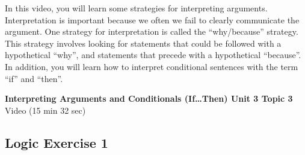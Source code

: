 \documentclass[
]{book}
\begin{document}
In this video, you will learn some strategies for interpreting arguments. Interpretation is important because we often we fail to clearly communicate the argument. One strategy for interpretation is called the ``why/because'' strategy. This strategy involves looking for statements that could be followed with a hypothetical ``why'', and statements that precede with a hypothetical ``because''. In addition, you will learn how to interpret conditional sentences with the term ``if'' and ``then''.

\textbf{Interpreting Arguments and Conditionals (If\ldots Then) Unit 3 Topic 3} Video (15 min 32 sec)

\hypertarget{logic-exercise-1-2}{%
\subsection*{Logic Exercise 1}\label{logic-exercise-1-2}}
\end{document}
